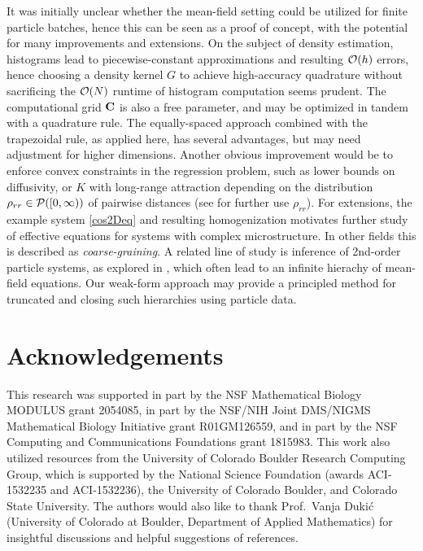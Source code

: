 \documentclass[english,reqno]{amsart}
\begin{document}
It was initially unclear whether the mean-field setting could be utilized for finite particle batches, hence this can be seen as a proof of concept, with the potential for many improvements and extensions. On the subject of density estimation, histograms lead to piecewise-constant approximations and resulting ${\mathcal{O}}(h)$ errors, hence choosing a density kernel $G$ to achieve high-accuracy quadrature without sacrificing the ${\mathcal{O}}(N)$ runtime of histogram computation seems prudent. The computational grid $\mathbf{C}$ is also a free parameter, and may be optimized in tandem with a quadrature rule. The equally-spaced approach combined with the trapezoidal rule, as applied here, has several advantages, but may need adjustment for higher dimensions. Another obvious improvement would be to enforce convex constraints in the regression problem, such as lower bounds on diffusivity, or $K$ with long-range attraction depending on the distribution $\rho_{rr}\in {\mathcal{P}}([0,\infty))$ of pairwise distances (see \cite{lu2020learning} for further use $\rho_{rr}$). For extensions, the example system \eqref{cos2Deq} and resulting homogenization motivates further study of effective equations for systems with complex microstructure. In other fields this is described as {\it coarse-graining}. A related line of study is inference of 2nd-order particle systems, as explored in \cite{supekar2021learning}, which often lead to an infinite hierachy of mean-field equations. Our weak-form approach may provide a principled method for truncated and closing such hierarchies using particle data.

\section{Acknowledgements}
This research was supported in part by the NSF Mathematical Biology MODULUS grant 2054085, in part by the NSF/NIH Joint DMS/NIGMS Mathematical Biology Initiative grant R01GM126559, and in part by the NSF Computing and Communications Foundations grant 1815983. This work also utilized resources from the University of Colorado Boulder Research Computing Group, which is supported by the National Science Foundation (awards ACI-1532235 and ACI-1532236), the University of Colorado Boulder, and Colorado State University. The authors would also like to thank Prof.\ Vanja Duki\'c (University of Colorado at Boulder, Department of Applied Mathematics) for insightful discussions and helpful suggestions of references.



\end{document}
